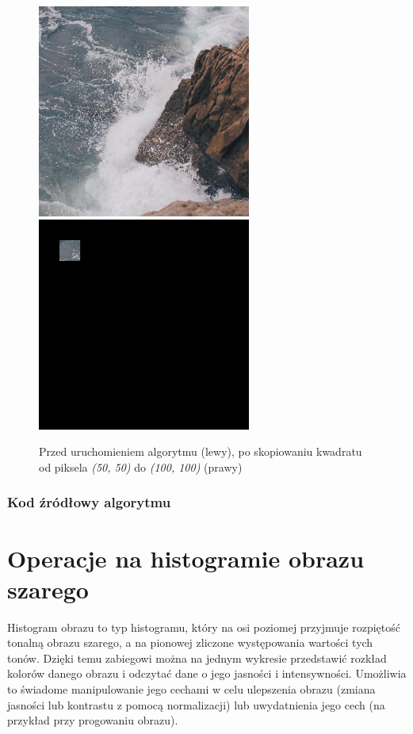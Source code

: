 \documentclass[a4paper,12pt]{book}
\begin{document}
\begin{figure}[H]
	\caption{Przed uruchomieniem algorytmu (lewy), po skopiowaniu kwadratu od piksela \textit{(50, 50)} do \textit{(100, 100)} (prawy)}
	\includegraphics[width=7cm, height=7cm]{sea-unmodified.jpg}
	\includegraphics[width=7cm, height=7cm]{4-6/copy-sea.png}
\end{figure}

\subsection*{Kod źródłowy algorytmu}

\chapter{Operacje na histogramie obrazu szarego}
Histogram obrazu to typ histogramu, który na osi poziomej przyjmuje rozpiętość tonalną obrazu szarego, a na pionowej zliczone występowania wartości tych tonów. Dzięki temu zabiegowi można na jednym wykresie przedstawić rozkład kolorów danego obrazu i odczytać dane o jego jasności i intensywności.  Umożliwia to świadome manipulowanie jego cechami w celu ulepszenia obrazu (zmiana jasności lub kontrastu z pomocą normalizacji) lub uwydatnienia jego cech (na przykład przy progowaniu obrazu). 
\end{document}
